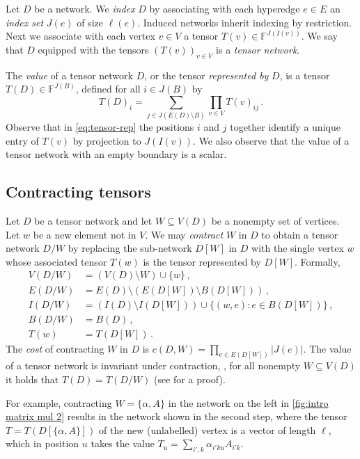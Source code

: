 \documentclass{toc}
\newcommand{\F}{\ensuremath{\mathbb{F}}}
\begin{document}
Let $D$ be a network.
We \emph{index} $D$ by associating with each hyperedge $e \in E$ an \emph{index set} $J(e)$ of size $\ell(e)$.  Induced networks inherit indexing by restriction.
Next we associate with each vertex $v\in V$ a tensor
$T(v)\in\F^{J(I(v))}$. We say that $D$ equipped with the tensors
$(T(v))_{v \in V}$ is a \emph{tensor network}.

The \emph{value} of a tensor network $D$, or the tensor \emph{represented by} $D$, is a tensor $T(D) \in \F^{J(B)}$, defined for all $i \in J(B)$ by
\begin{equation}
\label{eq:tensor-rep}
T(D)_i=
\sum_{j\in J(E(D)\setminus B)}
\prod_{v\in V}T(v)_{ij}\,.
\end{equation}
Observe that in \eqref{eq:tensor-rep}
the positions $i$ and $j$ together identify a unique entry of $T(v)$
by projection to $J(I(v))$.
We also observe that the value of a tensor network with an empty boundary is a scalar.

\subsection{Contracting tensors}

Let $D$ be a tensor network and let $W\subseteq V(D)$ be a nonempty set
of vertices. Let $w$ be a new element not in $V$.
We may \emph{contract} $W$ in $D$ to obtain a tensor network $D/W$ by replacing the sub-network $D[W]$ in $D$ with the single vertex $w$ whose associated tensor $T(w)$ is the tensor represented by $D[W]$.  Formally,
\begin{equation}
\label{eq:contraction}
\begin{aligned}
V(D/W)&=(V(D)\setminus W)\cup\{w\}\,,\\
E(D/W)&=E(D)\setminus\left(E(D[W])\setminus B(D[W])\right)\,,\\
I(D/W)&=\left(I(D)\setminus I(D[W])\right)\cup\{(w,e):e\in B(D[W])\}\,,\\
B(D/W)&=B(D)\,,\\
T(w)&=T(D[W])\,.
\end{aligned}
\end{equation}
The \emph{cost} of contracting $W$ in $D$ is
$c(D,W)=\prod_{e\in E(D[W])}|J(e)|$.
The value of a tensor network is invariant under contraction, \ie,
for all nonempty $W\subseteq V(D)$ it holds that $T(D)=T(D/W)$ (see
 for a proof).

For example, contracting $W = \{\alpha, A\}$ in the network on the
left in \eqref{fig:intro matrix mul 2} results in the network shown in
the second step, where the tensor $T = T(D[\{\alpha, A\}])$ of the new (unlabelled) vertex
is a vector of length $\ell$, which in position $u$ takes the value
$T_u = \sum_{i', k} \alpha_{i'ku} A_{i'k}$.
\end{document}
